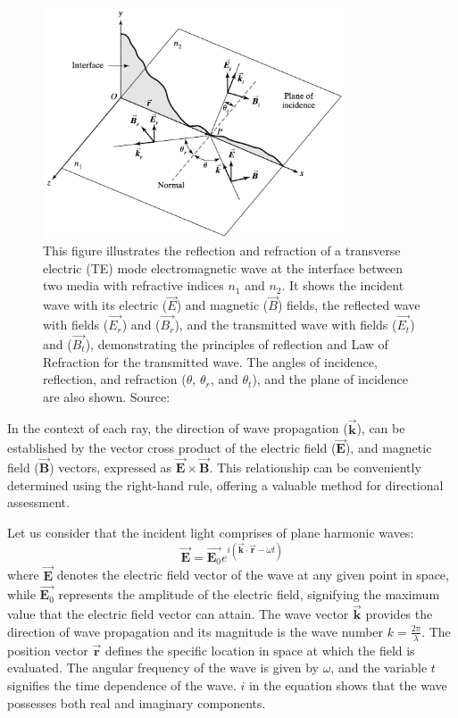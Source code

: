 \begin{figure}[ht!]
  \centering
  \includegraphics[width=0.8\textwidth]{Chapters/Figures/Chapter 2 Figures/Incident, Reflected, and Transmitted Ray for TE Mode.png}
  \caption[The transverse electric (TE) set-up]{This figure illustrates the reflection and refraction of a transverse electric (TE) mode electromagnetic wave at the interface between two media with refractive indices $n_1$ and $n_2$. It shows the incident wave with its electric ($\vec{E}$) and magnetic ($\vec{B}$) fields, the reflected wave with fields ($\vec{E_r}$) and ($\vec{B_r}$), and the transmitted wave with fields ($\vec{E_t}$) and ($\vec{B_t}$), demonstrating the principles of reflection and Law of Refraction for the transmitted wave. The angles of incidence, reflection, and refraction ($\theta$, $\theta_r$, and $\theta_t$), and the plane of incidence are also shown. Source: \cite{pedrotti_introduction_2007}}
  \label{fig:The TE Set-up}
\end{figure}

In the context of each ray, the direction of wave propagation ($\vec{\mathbf{k}}$), can be established by the vector cross product of the electric field ($\vec{\mathbf{E}}$), and magnetic field ($\vec{\mathbf{B}}$) vectors, expressed as $\vec{\mathbf{E}} \times \vec{\mathbf{B}}$. This relationship can be conveniently determined using the right-hand rule, offering a valuable method for directional assessment.

Let us consider that the incident light comprises of plane harmonic waves:
\begin{equation} \label{Plane harmonic wave equation - incident}
\vec{\mathbf{E}} = \vec{\mathbf{E}_0} e^{i(\vec{\mathbf{k}} \cdot \vec{\mathbf{r}} - \omega t)}
\end{equation} where $\vec{\mathbf{E}}$ denotes the electric field vector of the wave at any given point in space, while $\vec{\mathbf{E}_0}$ represents the amplitude of the electric field, signifying the maximum value that the electric field vector can attain. The wave vector $\vec{\mathbf{k}}$ provides the direction of wave propagation and its magnitude is the wave number $k=\frac{2\pi}{\lambda}$. The position vector $\vec{\mathbf{r}}$ defines the specific location in space at which the field is evaluated. The angular frequency of the wave is given by $\omega$, and the variable $t$ signifies the time dependence of the wave. $i$ in the equation shows that the wave possesses both real and imaginary components.

